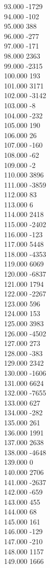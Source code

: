 { 93.000	-1729 \\
 94.000	-102 \\
 95.000	388 \\
 96.000	-277 \\
 97.000	-171 \\
 98.000	2363 \\
 99.000	-2315 \\
 100.000	193 \\
 101.000	3171 \\
 102.000	-3142 \\
 103.000	-8 \\
 104.000	-232 \\
 105.000	190 \\
 106.000	26 \\
 107.000	-160 \\
 108.000	-62 \\
 109.000	-2 \\
 110.000	3896 \\
 111.000	-3859 \\
 112.000	83 \\
 113.000	6 \\
 114.000	2418 \\
 115.000	-2402 \\
 116.000	-123 \\
 117.000	5448 \\
 118.000	-4353 \\
 119.000	6069 \\
 120.000	-6837 \\
 121.000	1794 \\
 122.000	-2267 \\
 123.000	596 \\
 124.000	153 \\
 125.000	3983 \\
 126.000	-4502 \\
 127.000	273 \\
 128.000	-383 \\
 129.000	2342 \\
 130.000	-1606 \\
 131.000	6624 \\
 132.000	-7655 \\
 133.000	627 \\
 134.000	-282 \\
 135.000	261 \\
 136.000	1991 \\
 137.000	2638 \\
 138.000	-4648 \\
 139.000	0 \\
 140.000	2706 \\
 141.000	-2637 \\
 142.000	-659 \\
 143.000	455 \\
 144.000	68 \\
 145.000	161 \\
 146.000	-129 \\
 147.000	-210 \\
 148.000	1157 \\
 149.000	1666 \\
}
